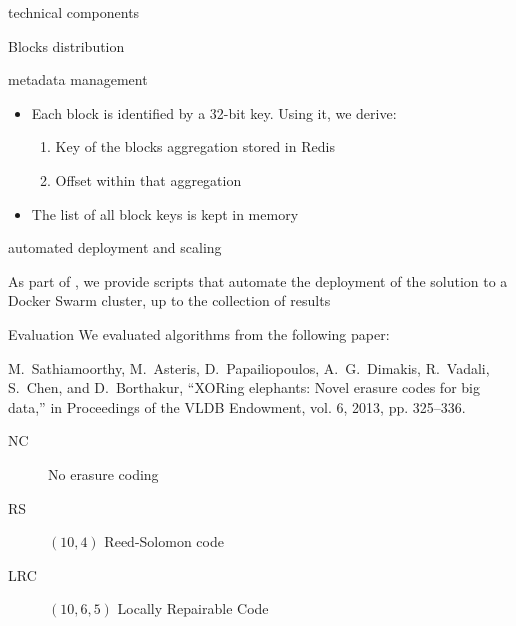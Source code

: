 \begin{frame}{\sys \enspace technical components}
    \centering
    
\end{frame}

\begin{frame}{Blocks distribution}
    \centering
    
\end{frame}

\begin{frame}{\sys\enspace metadata management}
  \begin{itemize}
  \item Each block is identified by a 32-bit key. Using it, we derive:
    \begin{enumerate}
        \item Key of the blocks aggregation stored in Redis
        \item Offset within that aggregation
    \end{enumerate}
    
    \item The list of all block keys is kept in memory

  \end{itemize}
\end{frame}

\begin{frame}{\sys\enspace automated deployment and scaling}
  \begin{snugshade}
    As part of \sys, we provide scripts that automate the deployment of the solution to a Docker Swarm cluster, up to the collection of results
  \end{snugshade}
\end{frame}

\subtitle[Evaluation]{Evaluation}

\begin{frame}{Evaluation}
    We evaluated algorithms from the following paper:

    \begin{snugshade}
        \footnotesize
        M.~Sathiamoorthy, M.~Asteris, D.~Papailiopoulos, A.~G.~Dimakis, R.~Vadali, S.~Chen, and D.~Borthakur, “XORing elephants: Novel erasure codes for big data,” in Proceedings of the VLDB Endowment, vol. 6, 2013, pp. 325–336.
    \end{snugshade}
    
    \begin{description}
        \item[NC] No erasure coding
        \item[RS] $(10,4)$ Reed-Solomon code
        \item[LRC] $(10,6,5)$ Locally Repairable Code
    \end{description}
\end{frame}

